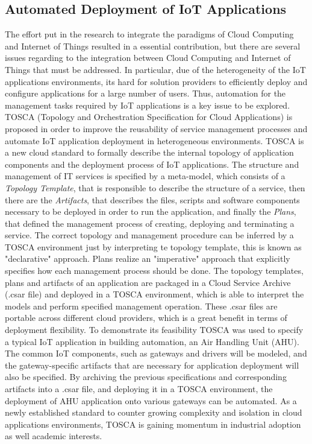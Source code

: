 \subsection{Automated Deployment of IoT Applications}
\label{sub:Automated Deployment of IoT Applications}
The effort put in the research to integrate the paradigms of Cloud Computing and Internet of Things resulted in a essential contribution, but there are several
issues regarding to the integration between Cloud Computing and Internet of Things that must be addressed. In particular, due of the heterogeneity of the IoT
applications environments, its hard for solution providers to efficiently deploy and configure applications for a large number of users. Thus, automation for
the management tasks required by IoT applications is a key issue to be explored.\\

TOSCA (Topology and Orchestration Specification for Cloud Applications) \cite{li2013towards} is proposed in order to improve the reusability of service management
processes and automate IoT application deployment in heterogeneous environments. TOSCA is a new cloud standard to formally describe the internal topology of
application components and the deployment process of IoT applications. The structure and management of IT services is specified by a meta-model, which consists
of a \textit{Topology Template}, that is responsible to describe the structure of a service, then there are the \textit{Artifacts}, that describes the files, scripts and
software components necessary to be deployed in order to run the application, and finally the \textit{Plans}, that defined the management process of creating, deploying and
terminating a service. The correct topology and management procedure can be inferred by a TOSCA environment just by interpreting te topology template, this is known
as "declarative" approach. Plans realize an "imperative" approach that explicitly specifies how each management process should be done. The topology templates, plans
and artifacts of an application are packaged in a Cloud Service Archive (.csar file) and deployed in a TOSCA environment, which is able to interpret the models and perform
specified management operation. These .csar files are portable across different cloud providers, which is a great benefit in terms of deployment flexibility.
To demonstrate its feasibility TOSCA was used to specify a typical IoT application in building automation, an Air Handling Unit (AHU). The common IoT components, such as gateways
and drivers will be modeled, and the gateway-specific artifacts that are necessary for application deployment will also be specified. By archiving the previous specifications
and corresponding artifacts into a .csar file, and deploying it in a TOSCA environment, the deployment of AHU application onto various gateways can be automated.
As a newly established standard to counter growing complexity and isolation in cloud applications environments, TOSCA is gaining momentum in industrial adoption as well academic interests.\\

